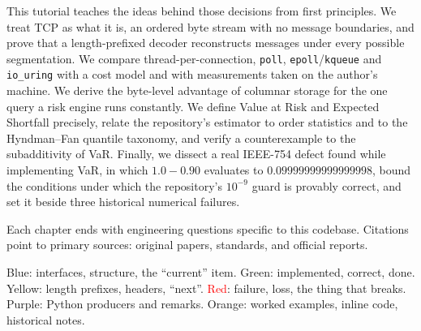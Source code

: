 This tutorial teaches the ideas behind those decisions from first principles. We treat TCP as what
it is, an ordered byte stream with no message boundaries, and prove that a length-prefixed decoder
reconstructs messages under every possible segmentation. We compare thread-per-connection,
\texttt{poll}, \texttt{epoll}/\texttt{kqueue} and \texttt{io\_uring} with a cost model and with
measurements taken on the author's machine. We derive the byte-level advantage of columnar storage
for the one query a risk engine runs constantly. We define Value at Risk and Expected Shortfall
precisely, relate the repository's estimator to order statistics and to the Hyndman--Fan quantile
taxonomy, and verify a counterexample to the subadditivity of VaR. Finally, we dissect a real
IEEE-754 defect found while implementing VaR, in which \(1.0-0.90\) evaluates to
\(0.09999999999999998\), bound the conditions under which the repository's \(10^{-9}\) guard is
provably correct, and set it beside three historical numerical failures.

Each chapter ends with engineering questions specific to this codebase. Citations point to primary
sources: original papers, standards, and official reports.

\begin{remarkbox}[title={Colour conventions used in every figure}]
\textcolor{acc}{Blue}: interfaces, structure, the ``current'' item.
\textcolor{grn}{Green}: implemented, correct, done.
\textcolor{yel}{Yellow}: length prefixes, headers, ``next''.
\textcolor{red}{Red}: failure, loss, the thing that breaks.
\textcolor{pur}{Purple}: Python producers and remarks.
\textcolor{org}{Orange}: worked examples, inline code, historical notes.
\end{remarkbox}

{\hypersetup{linkcolor=fg}\setlength{\parskip}{0pt}\tableofcontents}

